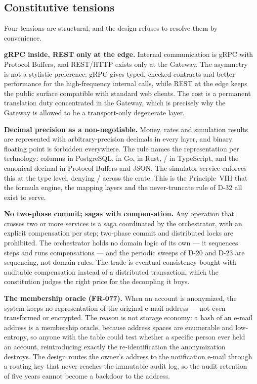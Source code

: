 \subsection{Constitutive tensions}

Four tensions are structural, and the design refuses to resolve them by
convenience.

\textbf{gRPC inside, REST only at the edge.} Internal communication is gRPC with
Protocol Buffers, and REST/HTTP exists only at the Gateway. The asymmetry is
not a stylistic preference: gRPC gives typed, checked contracts and better
performance for the high-frequency internal calls, while REST at the edge keeps
the public surface compatible with standard web clients. The cost is a permanent
translation duty concentrated in the Gateway, which is precisely why the Gateway
is allowed to be a transport-only degenerate layer.

\textbf{Decimal precision as a non-negotiable.} Money, rates and simulation
results are represented with arbitrary-precision decimals in every layer, and
binary floating point is forbidden everywhere. The rule names the representation
per technology:  columns in PostgreSQL,
 in Go,  in Rust,
/ in TypeScript, and the canonical decimal
 in Protocol Buffers and JSON. The simulator service enforces this at
the type level, denying / across the crate. This is the
Principle~VIII that the formula engine, the mapping layers and the never-truncate
rule of D-32 all exist to serve.

\textbf{No two-phase commit; sagas with compensation.} Any operation that crosses
two or more services is a saga coordinated by the orchestrator, with an explicit
compensation per step; two-phase commit and distributed locks are prohibited. The
orchestrator holds no domain logic of its own --- it sequences steps and runs
compensations --- and the periodic sweeps of D-20 and D-23 are sequencing, not
domain rules. The trade is eventual consistency bought with auditable
compensation instead of a distributed transaction, which the constitution judges
the right price for the decoupling it buys.

\textbf{The membership oracle (FR-077).} When an account is anonymized, the
system keeps no representation of the original e-mail address --- not even
transformed or encrypted. The reason is not storage economy: a hash of an e-mail
address is a membership oracle, because address spaces are enumerable and
low-entropy, so anyone with the table could test whether a specific person ever
held an account, reintroducing exactly the re-identification the anonymization
destroys. The design routes the owner's address to the notification e-mail
through a routing key that never reaches the immutable audit log, so the audit
retention of five years cannot become a backdoor to the address.

